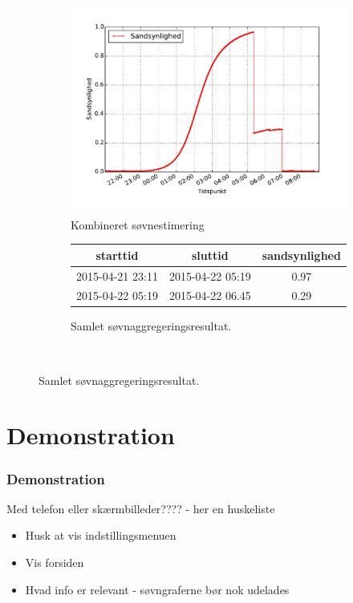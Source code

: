\begin{frame}
{\begin{figure}
\begin{minipage}{\linewidth}
\begin{minipage}{\linewidth}
		\begin{subfigure}{\linewidth}
			\centering
			\includegraphics[scale=0.2, trim = 1cm 1cm 1cm 1cm, clip]{../Report/grafik/kombi_figur/combined-sleep-estimate-plot}
			\caption{Kombineret søvnestimering}\label{fig:sleepcalcombine}
		\end{subfigure}
		\end{minipage}
		\begin{minipage}{\linewidth}
		\begin{subfigure}{\linewidth}
			\centering
			\begin{tabular}{|c|c|c|}
			\hline starttid & sluttid & sandsynlighed \\ 
			\hline 2015-04-21 23:11 & 2015-04-22 05:19 & 0.97 \\ 
			\hline 2015-04-22 05:19 & 2015-04-22 06.45 & 0.29 \\ 
			\hline 
			\end{tabular}
			\caption{Samlet søvnaggregeringsresultat.}\label{fig:finalagg}
		\end{subfigure}
		\end{minipage}
	\end{minipage}\\[1ex]%
\end{figure}
}
\end{frame}

\section{Demonstration}
\begin{frame}
	\frametitle{Demonstration}
	Med telefon eller skærmbilleder???? - her en huskeliste
	\begin{itemize}
		\item Husk at vis indstillingsmenuen
		\item Vis forsiden
		\item Hvad info er relevant - søvngraferne bør nok udelades
	\end{itemize}
\end{frame}


